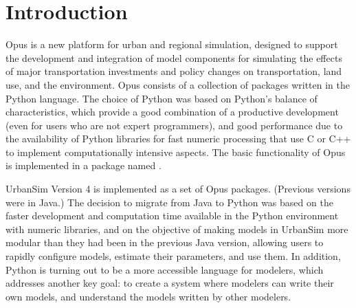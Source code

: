 

\chapter{Introduction}
\label{chapter:introduction}


Opus is a new platform for urban and regional simulation, designed to
support the development and integration of model
components  for simulating the
effects of major transportation investments and policy changes
on transportation,  land use, 
and the environment. 
Opus consists of a collection of packages 
written in the Python \pythonindex language. The choice of
Python \pythonindex was based on Python's \pythonindex
balance of characteristics, which provide a good combination of a
productive development (even for users who are not expert programmers), and
good performance  due to the availability of Python \pythonindex
libraries  for fast
numeric processing  that use C \cindex or C++ \cppindex
to implement computationally intensive
aspects.  The basic functionality of Opus is implemented in a package named .

UrbanSim Version 4  is implemented as a set of
Opus packages. (Previous versions  were in Java.) \javaindex
The decision to migrate from Java \javaindex to Python \pythonindex
was based on the faster development and computation time available
in the Python \pythonindex environment with numeric libraries, and on the objective of
making models  in UrbanSim more modular than they had been in the previous
Java \javaindex version, allowing users to rapidly configure models,  estimate their
parameters, and use them. In addition, Python \pythonindex is turning out to be a more
accessible language for modelers, which addresses another key goal:  to
create a system where modelers can write their own models, and understand
the models written by other modelers.

